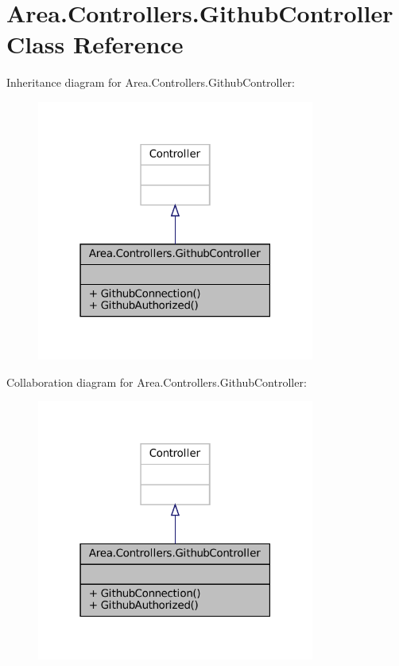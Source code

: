 \hypertarget{classArea_1_1Controllers_1_1GithubController}{}\section{Area.\+Controllers.\+Github\+Controller Class Reference}
\label{classArea_1_1Controllers_1_1GithubController}


Inheritance diagram for Area.\+Controllers.\+Github\+Controller\+:
\nopagebreak
\begin{figure}[H]
\begin{center}
\leavevmode
\includegraphics[width=259pt]{classArea_1_1Controllers_1_1GithubController__inherit__graph}
\end{center}
\end{figure}


Collaboration diagram for Area.\+Controllers.\+Github\+Controller\+:
\nopagebreak
\begin{figure}[H]
\begin{center}
\leavevmode
\includegraphics[width=259pt]{classArea_1_1Controllers_1_1GithubController__coll__graph}
\end{center}
\end{figure}
